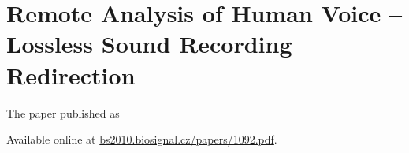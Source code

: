 \chapter{Remote Analysis of Human Voice – Lossless Sound Recording Redirection}\label{app:remote}
The paper \cite{kulhanek2010b} published as
 

Available online at \href{http://bs2010.biosignal.cz/papers/1092.pdf}{bs2010.biosignal.cz/papers/1092.pdf}.

%